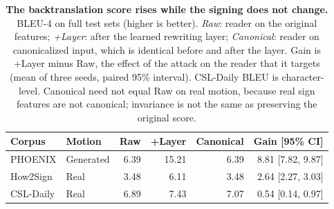 \begin{table}[t]
\centering\footnotesize\setlength{\tabcolsep}{4pt}
\caption{\textbf{The backtranslation score rises while the signing does not change.} BLEU-4 on full test sets (higher is better). \emph{Raw}: reader on the original features; \emph{+Layer}: after the learned rewriting layer; \emph{Canonical}: reader on canonicalized input, which is identical before and after the layer. Gain is +Layer minus Raw, the effect of the attack on the reader that it targets (mean of three seeds, paired 95\% interval). CSL-Daily BLEU is character-level. Canonical need not equal Raw on real motion, because real sign features are not canonical; invariance is not the same as preserving the original score.}\label{tab:sign}
\begin{tabular}{@{}llrrrr@{}}\toprule
Corpus&Motion&Raw&+Layer&Canonical&Gain [95\% CI]\\\midrule
PHOENIX&Generated&6.39&15.21&6.39&8.81 [7.82, 9.87]\\
How2Sign&Real&3.48&6.11&3.48&2.64 [2.27, 3.03]\\
CSL-Daily&Real&6.89&7.43&7.07&0.54 [0.14, 0.97]\\
\bottomrule\end{tabular}\end{table}
